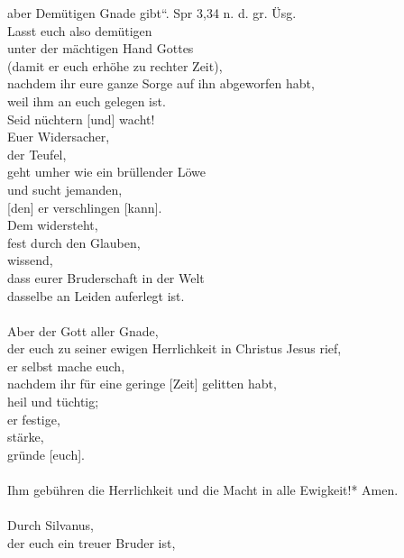             aber Demütigen Gnade gibt“. {Spr 3,34 n. d. gr. Üsg.}\\
            Lasst euch also demütigen \\
                unter der mächtigen Hand Gottes \\
                    (damit er euch erhöhe zu rechter Zeit),\\
                nachdem ihr eure ganze Sorge auf ihn abgeworfen habt, \\
                    weil ihm an euch gelegen ist. \\
    Seid nüchtern [und] wacht! \\
        Euer Widersacher, \\
        der Teufel, \\
        geht umher wie ein brüllender Löwe \\
        und sucht jemanden, \\
        [den] er verschlingen [kann].\\
    Dem widersteht, \\
        fest durch den Glauben, \\
        wissend, \\
        dass eurer Bruderschaft in der Welt \\
        dasselbe an Leiden auferlegt ist. \\
\\
    Aber der Gott aller Gnade, \\
        der euch zu seiner ewigen Herrlichkeit in Christus Jesus rief, \\
        er selbst mache euch, \\
        nachdem ihr für eine geringe [Zeit] gelitten habt, \\
            heil und tüchtig; \\
            er festige, \\
            stärke, \\
            gründe [euch]. \\
\\
    Ihm gebühren die Herrlichkeit und die Macht in alle Ewigkeit!* Amen. \\
\\
    Durch Silvanus, \\
        der euch ein treuer Bruder ist, \\
